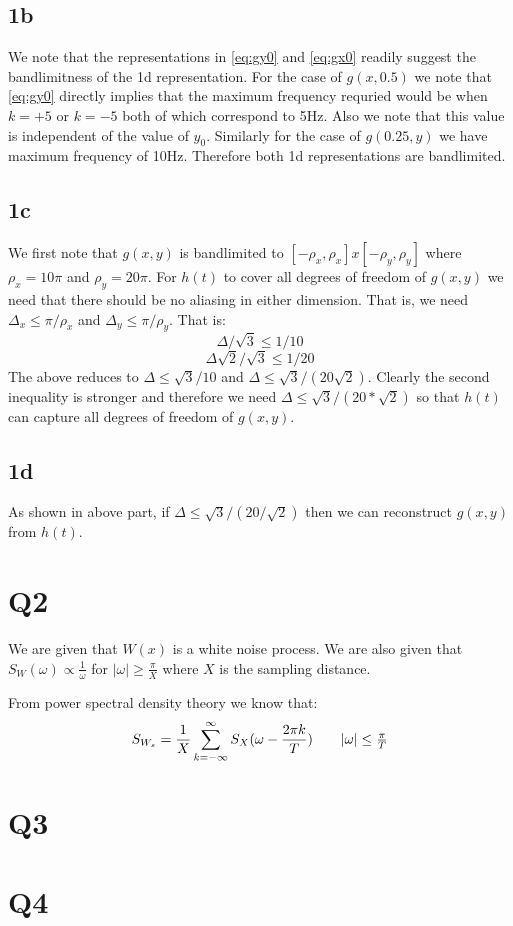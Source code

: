\documentclass{article}
\begin{document}
\subsection*{1b}
We note that the representations in \ref{eq:gy0} and \ref{eq:gx0} readily suggest the bandlimitness of the 1d representation. For the case of $g(x, 0.5)$ we note that \ref{eq:gy0} directly implies that the maximum frequency requried would be when $k = +5$ or $k = -5$ both of which correspond to 5Hz. Also we note that this value is independent of the value of $y_0$. Similarly for the case of $g(0.25, y)$ we have maximum frequency of 10Hz. Therefore both 1d representations are bandlimited.

\subsection*{1c}
We first note that $g(x,y)$ is bandlimited to $[-\rho_x, \rho_x] x [-\rho_y, \rho_y]$ where $\rho_x = 10\pi$ and $\rho_y = 20 \pi$. For $h(t)$ to cover all degrees of freedom of $g(x, y)$ we need that there should be no aliasing in either dimension. That is, we need $\Delta_x \le \pi / \rho_x$ and $\Delta_y \le \pi / \rho_y$. That is:
$$\Delta / \sqrt{3} \le 1 /10$$
$$\Delta \sqrt{2} / \sqrt{3} \le 1 / 20$$
The above reduces to $\Delta \le \sqrt{3} / 10$ and $\Delta \le \sqrt{3}/(20 \sqrt{2})$. Clearly the second inequality is stronger and therefore we need $\Delta \le \sqrt{3} / (20 * \sqrt{2})$ so that $h(t)$ can capture all degrees of freedom of $g(x, y)$.

\subsection*{1d}
As shown in above part, if $\Delta \le \sqrt{3} / (20 / \sqrt{2})$ then we can reconstruct $g(x, y)$ from $h(t)$.

\section*{Q2}
We are given that $W(x)$ is a white noise process. We are also given that $S_W(\omega) \propto \frac{1}{\omega}$ for $|\omega| \ge \frac{\pi}{X}$ where $X$ is the sampling distance.

From power spectral density theory we know that:
\begin{align}
  \label{eq:psd1}
  S_{W_s} = \frac{1}{X}\sum_{k=-\infty}^{\infty}S_X(\omega - \frac{2\pi k}{T}) \tag*{$|\omega| \le \frac{\pi}{T}$}
\end{align}

\section*{Q3}

\section*{Q4}
\end{document}
